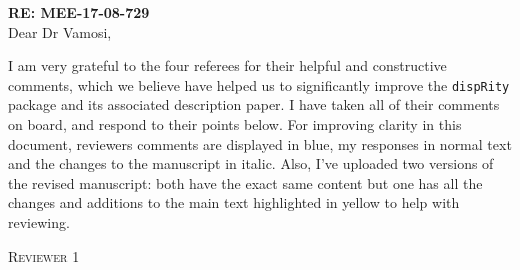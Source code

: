 \documentclass[12pt,letterpaper]{article}
\renewcommand{\section}[1]{%
\bigskip
\begin{center}
\begin{Large}
\normalfont\scshape #1
\medskip
\end{Large}
\end{center}}
\begin{document}
\textbf{RE: MEE-17-08-729 }\\
\bigskip
Dear Dr Vamosi,\\
\bigskip

I am very grateful to the four referees for their helpful and constructive comments, which we believe have helped us to significantly improve the \texttt{dispRity} package and its associated description paper.
I have taken all of their comments on board, and respond to their points below.
For improving clarity in this document, reviewers comments are displayed in blue, my responses in normal text and the changes to the manuscript in italic.
Also, I've uploaded two versions of the revised manuscript: both have the exact same content but one has all the changes and additions to the main text highlighted in yellow to help with reviewing.




\section{Reviewer 1}
\end{document}
